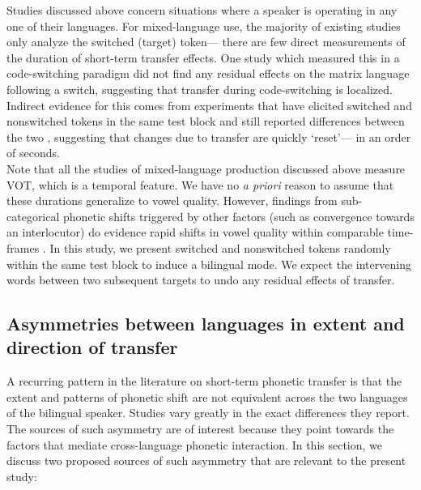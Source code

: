 \documentclass[12 pt]{article}
\begin{document}
Studies discussed above concern situations where a speaker is operating in any one of their languages. For mixed-language use, the majority of existing studies only analyze the switched (target) token--- there are few direct measurements of the duration of short-term transfer effects. One study which measured this in a code-switching paradigm \citep[][VOT]{bullock2009trying} did not find any residual effects on the matrix language following a switch, suggesting that transfer during code-switching is localized. Indirect evidence for this comes from experiments that have elicited switched and nonswitched tokens in the same test block and still reported differences between the two \citep[e.g.][VOT]{tsui2019impact,olson2013bilingual}, suggesting that changes due to transfer are quickly `reset'--- in an order of seconds.\\
Note that all the studies of mixed-language production discussed above measure VOT, which is a temporal feature. We have no \textit{a priori} reason to assume that these durations generalize to vowel quality. However, findings from sub-categorical phonetic shifts triggered by other factors (such as convergence towards an interlocutor) do evidence rapid shifts in vowel quality within comparable time-frames \citep[e.g.][]{pardo2010expressing,babel2010dialect,babel2012evidence}. In this study, we present switched and nonswitched tokens randomly within the same test block to induce a bilingual mode. We expect the intervening words between two subsequent targets to undo any residual effects of transfer.

\subsection{Asymmetries between languages in extent and direction of transfer} \label{asymmetries}
A recurring pattern in the literature on short-term phonetic transfer is that the extent and patterns of phonetic shift are not equivalent across the two languages of the bilingual speaker. Studies vary greatly in the exact differences they report. The sources of such asymmetry are of interest because they point towards the factors that mediate cross-language phonetic interaction. In this section, we discuss two proposed sources of such asymmetry that are relevant to the present study: 
\end{document}
